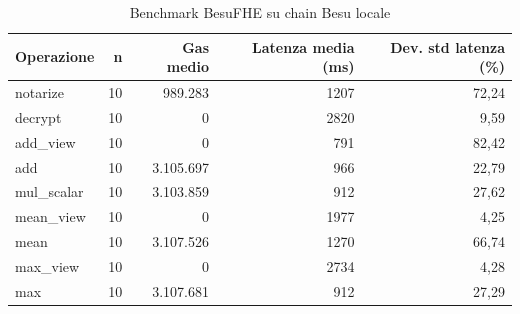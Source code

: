 \begin{table}[H]
\centering
\caption{Benchmark BesuFHE su chain Besu locale}
\label{tab:besufhe-local-benchmark}
\begin{tabular}{lrrrr}
\hline
\textbf{Operazione} & \textbf{n} & \textbf{Gas medio} & \textbf{Latenza media (ms)} & \textbf{Dev. std latenza (\%)} \\
\hline
notarize & 10 & 989.283 & 1207 & 72,24 \\
decrypt & 10 & 0 & 2820 & 9,59 \\
add\_view & 10 & 0 & 791 & 82,42 \\
add & 10 & 3.105.697 & 966 & 22,79 \\
mul\_scalar & 10 & 3.103.859 & 912 & 27,62 \\
mean\_view & 10 & 0 & 1977 & 4,25 \\
mean & 10 & 3.107.526 & 1270 & 66,74 \\
max\_view & 10 & 0 & 2734 & 4,28 \\
max & 10 & 3.107.681 & 912 & 27,29 \\
\hline
\end{tabular}
\end{table}
\vspace{4pt}

